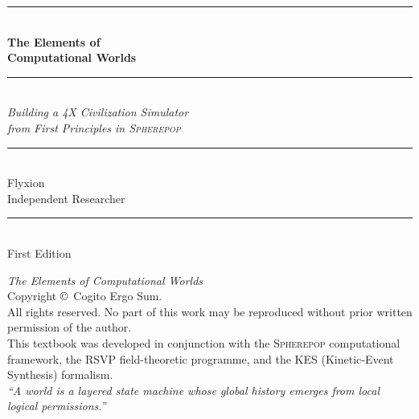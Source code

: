 \documentclass[11pt,a4paper,openany]{book}
\theoremstyle{plain}
\theoremstyle{definition}
\theoremstyle{remark}
\newcommand{\Sp}{\textsc{Spherepop}\xspace}
\begin{document}
\sloppy
\setlength{\emergencystretch}{3em}
\hfuzz=4pt
\frontmatter

\begin{titlepage}
  \centering
  \vspace*{1.5cm}
  {\color{sphereblue}\rule{\linewidth}{2pt}}\\[0.6cm]
  {\Huge\bfseries\color{sphereblue} The Elements of\\[0.3em]
   Computational Worlds}\\[0.5cm]
  {\color{sphereblue!30}\rule{\linewidth}{1pt}}\\[0.4cm]
  {\Large\itshape\color{sphereteal}
   Building a 4X Civilization Simulator\\
   from First Principles in \textsc{Spherepop}}\\[1.2cm]
  {\color{sphereblue!30}\rule{0.4\linewidth}{0.4pt}}\\[0.5cm]
  {\large Flyxion}\\[0.2cm]
  {\small\color{spheregray} Independent Researcher}\\[2.5cm]
  \vfill
  {\color{sphereblue!30}\rule{\linewidth}{1pt}}\\[0.3cm]
  {\small\color{spheregray} First Edition}
\end{titlepage}

\thispagestyle{empty}
\vspace*{\fill}
\noindent\textit{The Elements of Computational Worlds}\\
\noindent Copyright \copyright\ Cogito Ergo Sum.\\[0.5em]
\noindent All rights reserved. No part of this work may be reproduced
without prior written permission of the author.\\[1em]
\noindent This textbook was developed in conjunction with the
\Sp{} computational framework, the RSVP field-theoretic programme,
and the KES (Kinetic-Event Synthesis) formalism.\\[1em]
\noindent\textit{``A world is a layered state machine whose global
history emerges from local logical permissions.''}
\vspace*{\fill}
\newpage
\end{document}
